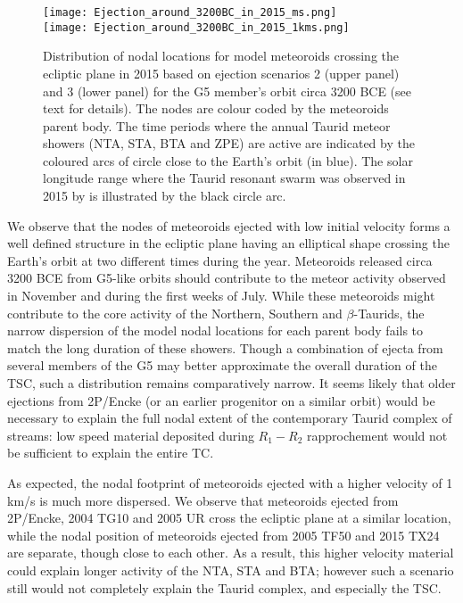 \documentclass[letters,a4paper,fleqn,usenatbib]{mnras}
\begin{document}
 \begin{figure}
   \texttt{[image: Ejection\_around\_3200BC\_in\_2015\_ms.png]}\\
   \texttt{[image: Ejection\_around\_3200BC\_in\_2015\_1kms.png]}\\
   \caption{Distribution of nodal locations for model meteoroids crossing the ecliptic plane in 2015 based on ejection scenarios 2 (upper panel) and 3 (lower panel) for the G5 member's orbit circa 3200 BCE (see text for details). The nodes are colour coded by the meteoroids parent body. The time periods where the annual Taurid meteor showers (NTA, STA, BTA and ZPE) are active are indicated by the coloured arcs of circle close to the Earth's orbit (in blue). The solar longitude range where the Taurid resonant swarm was observed in 2015 by \protect\cite{Spurny2017} is illustrated by the black circle arc.} \label{fig:ejection_in_2015}
 \end{figure}
 
We observe that the nodes of meteoroids ejected with low initial velocity forms a well defined structure in the ecliptic plane having an elliptical shape crossing the Earth's orbit at two different times during the year. Meteoroids released circa 3200 BCE from G5-like orbits should contribute to the meteor activity observed in November and during the first weeks of July. While these meteoroids might contribute to the core activity of the Northern, Southern and $\beta$-Taurids, the narrow dispersion of the model nodal locations for each parent body fails to match the long duration of these showers. Though a combination of ejecta from several members of the G5 may better approximate the overall duration of the TSC, such a distribution remains comparatively narrow.  It seems likely that older ejections from 2P/Encke (or an earlier progenitor on a similar orbit) would be necessary to explain the full nodal extent of the contemporary Taurid complex of streams: low speed material deposited during $R_1-R_2$ rapprochement would not be sufficient to explain the entire TC.   

As expected, the nodal footprint of meteoroids ejected with a higher velocity of 1 km/s is much more dispersed. We observe that meteoroids ejected from 2P/Encke, 2004 TG10 and 2005 UR cross the ecliptic plane at a similar location, while the nodal position of meteoroids ejected from 2005 TF50 and 2015 TX24 are separate, though close to each other. As a result, this higher velocity material could explain longer activity of the NTA, STA and BTA; however such a scenario still would not completely explain the Taurid complex, and especially the TSC. 
\end{document}
